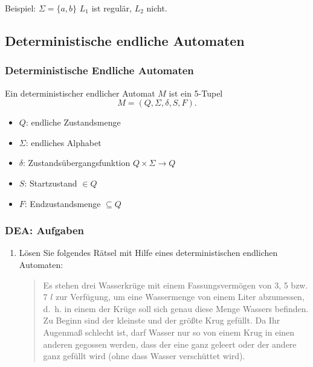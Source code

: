 \documentclass{beamer}
\begin{document}
{\begin{frame}
\begin{itemize}
\end{itemize}
Beispiel:
\(\Sigma = \{a,b\}\)
	\(L_1\) ist regulär, \(L_2\) nicht.
\end{frame}

\subsection{Deterministische endliche Automaten}
\begin{frame}
\frametitle{Deterministische Endliche Automaten}
        Ein deterministischer endlicher Automat $M$ ist ein 5-Tupel
        \[
        M= (Q,\Sigma,\delta,S,F).
        \]
        \begin{itemize}
        \item $Q$:  endliche Zustandsmenge
        \item $\Sigma$:    endliches Alphabet
        \item $\delta$:   Zustandsübergangsfunktion $Q\times \Sigma \rightarrow Q$
        \item $S$:   Startzustand $\in Q$
        \item $F$:   Endzustandsmenge $\subseteq Q$
        \end{itemize}
\end{frame}
\begin{frame}
	\frametitle{DEA: Aufgaben}
	\begin{enumerate}
	\item 
		Lösen Sie folgendes Rätsel mit Hilfe eines deterministischen
		endlichen Automaten:
		\begin{quote}
		  Es stehen drei Wasserkrüge mit einem Fassungsvermögen
		  von 3, 5 bzw. 7 $l$ zur Verfügung, um eine Wassermenge von
		  einem Liter abzumessen, d.~h. in einem der Krüge soll sich genau
		  diese Menge Wassers befinden. Zu Beginn sind der kleinste und
		  der größte Krug gefüllt. Da Ihr Augenmaß schlecht
		  ist, darf Wasser nur so von einem Krug in einen anderen
		  gegossen werden, dass der eine ganz geleert oder der andere
		  ganz gefüllt wird (ohne dass Wasser verschüttet wird).
		\end{quote}

\end{enumerate}
\end{frame}}
\end{document}
